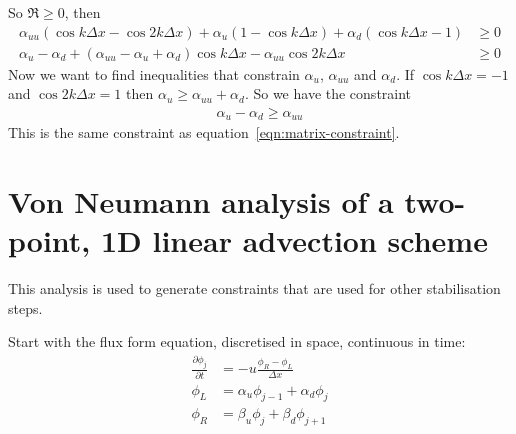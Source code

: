 \documentclass{article}
\begin{document}
So $\Re \geq 0$, then
\begin{align}
\alpha_{uu} \left( \cos k\Delta x - \cos 2k\Delta x \right) + \alpha_u \left( 1 - \cos k \Delta x \right) + \alpha_d \left( \cos k\Delta x - 1 \right) &\geq 0 \\
\alpha_u - \alpha_d + \left( \alpha_{uu} - \alpha_u + \alpha_d \right) \cos k\Delta x - \alpha_{uu} \cos 2k\Delta x &\geq 0
\end{align}
Now we want to find inequalities that constrain $\alpha_u$, $\alpha_{uu}$ and $\alpha_d$.
If $\cos k\Delta x = -1$ and $\cos 2k\Delta x = 1$ then $\alpha_u \geq \alpha_{uu} + \alpha_d$.
So we have the constraint
\begin{align}
\alpha_u - \alpha_d \geq \alpha_{uu}
\end{align}
This is the same constraint as equation~\eqref{eqn:matrix-constraint}.

\newpage

\section{Von Neumann analysis of a two-point, 1D linear advection scheme}
This analysis is used to generate constraints that are used for other stabilisation steps.

Start with the flux form equation, discretised in space, continuous in time:
\begin{align}
\frac{\partial \phi_j}{\partial t} &= - u \frac{\phi_R - \phi_L}{\Delta x} \label{eqn:advection} \\
\phi_L &= \alpha_u \phi_{j-1} + \alpha_d \phi_j \\
\phi_R &= \beta_u \phi_j + \beta_d \phi_{j+1}
\end{align}
\end{document}
